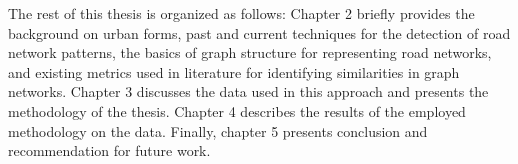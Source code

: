 The rest of this thesis is organized as follows: Chapter 2 briefly provides the background on urban forms, past and current techniques for the detection of road network patterns, the basics of graph structure for representing road networks, and existing metrics used in literature for identifying similarities in graph networks. Chapter 3 discusses the data used in this approach  and presents the methodology of the thesis. Chapter 4 describes the results of the employed methodology on the data. Finally, chapter 5 presents conclusion and recommendation for future work. 


